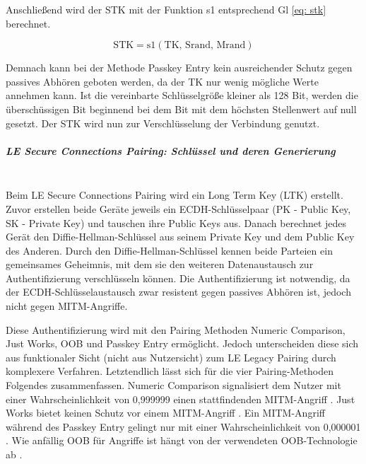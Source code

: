 Anschließend wird der STK mit der Funktion s1 \cite{BtSpec4.2_2290} 
entsprechend Gl \ref{eq: stk} \cite{BtSpec4.2_2305-2306} berechnet.

\begin{equation}
    \text{STK} = \text{s1}(\text{TK, Srand, Mrand})
    \label{eq: stk}
\end{equation}

Demnach kann bei der Methode Passkey Entry kein ausreichender Schutz gegen passives Abhören geboten werden, da der TK nur wenig mögliche Werte annehmen kann. Ist die vereinbarte Schlüsselgröße kleiner als 128 Bit, werden die überschüssigen Bit beginnend bei dem Bit mit dem höchsten Stellenwert auf null gesetzt. Der STK wird nun zur Verschlüsselung der Verbindung genutzt. \cite{BtSpec4.2_2305-2306}

\subparagraph{LE Secure Connections Pairing: Schlüssel und deren Generierung} \mbox{} \vspace{0.2cm} \\
Beim LE Secure Connections Pairing wird ein Long Term Key (LTK) erstellt. Zuvor erstellen beide Geräte jeweils ein ECDH-Schlüsselpaar (PK - Public Key, SK - Private Key) und tauschen ihre Public Keys aus. Danach berechnet jedes Gerät den Diffie-Hellman-Schlüssel aus seinem Private Key und dem Public Key des Anderen. Durch den Diffie-Hellman-Schlüssel kennen beide Parteien ein gemeinsames Geheimnis, mit dem sie den weiteren Datenaustausch zur Authentifizierung verschlüsseln können. Die Authentifizierung ist notwendig, da der ECDH-Schlüsselaustausch zwar resistent gegen passives Abhören ist, jedoch nicht gegen MITM-Angriffe. \cite{BtSpec4.2_2307}

Diese Authentifizierung wird mit den Pairing Methoden Numeric Comparison, Just Works, OOB und Passkey Entry ermöglicht. Jedoch unterscheiden diese sich aus funktionaler Sicht (nicht aus Nutzersicht) zum LE Legacy Pairing durch komplexere Verfahren. Letztendlich lässt sich für die vier Pairing-Methoden Folgendes zusammenfassen. Numeric Comparison signalisiert dem Nutzer mit einer Wahrscheinlichkeit von 0,999999 einen stattfindenden MITM-Angriff \cite{BtSpec4.2_2309}. 
Just Works bietet keinen Schutz vor einem MITM-Angriff \cite{BtSpec4.2_245}. 
Ein MITM-Angriff während des Passkey Entry gelingt nur mit einer Wahrscheinlichkeit von 0,000001 \cite{BtSpec4.2_2311}. 
Wie anfällig OOB für Angriffe ist hängt von der verwendeten OOB-Technologie ab \cite{BtSpec4.2_2312-2313}.

